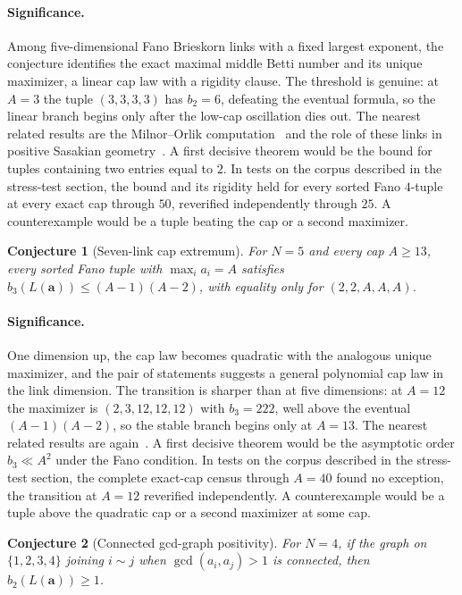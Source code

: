 \documentclass[11pt]{article}
\newtheorem{conjecture}{Conjecture}
\theoremstyle{definition}
\begin{document}
\paragraph{Significance.}
Among five-dimensional Fano Brieskorn links with a fixed largest exponent, the conjecture identifies the exact maximal middle Betti number and its unique maximizer, a linear cap law with a rigidity clause.  The threshold is genuine: at $A=3$ the tuple $(3,3,3,3)$ has $b_2=6$, defeating the eventual formula, so the linear branch begins only after the low-cap oscillation dies out.  The nearest related results are the Milnor--Orlik computation~\cite{MO70} and the role of these links in positive Sasakian geometry~\cite{BG08,BMvK16}.  A first decisive theorem would be the bound for tuples containing two entries equal to $2$.  In tests on the corpus described in the stress-test section, the bound and its rigidity held for every sorted Fano $4$-tuple at every exact cap through $50$, reverified independently through $25$.  A counterexample would be a tuple beating the cap or a second maximizer.

\begin{conjecture}[Seven-link cap extremum]\label{x7}
For $N=5$ and every cap $A\ge13$, every sorted Fano tuple with $\max_ia_i=A$ satisfies $b_3(L(\mathbf a))\le(A-1)(A-2)$, with equality only for $(2,2,A,A,A)$.
\end{conjecture}

\paragraph{Significance.}
One dimension up, the cap law becomes quadratic with the analogous unique maximizer, and the pair of statements suggests a general polynomial cap law in the link dimension.  The transition is sharper than at five dimensions: at $A=12$ the maximizer is $(2,3,12,12,12)$ with $b_3=222$, well above the eventual $(A-1)(A-2)$, so the stable branch begins only at $A=13$.  The nearest related results are again~\cite{MO70,BG08}.  A first decisive theorem would be the asymptotic order $b_3\ll A^2$ under the Fano condition.  In tests on the corpus described in the stress-test section, the complete exact-cap census through $A=40$ found no exception, the transition at $A=12$ reverified independently.  A counterexample would be a tuple above the quadratic cap or a second maximizer at some cap.

\begin{conjecture}[Connected gcd-graph positivity]\label{x8}
For $N=4$, if the graph on $\{1,2,3,4\}$ joining $i\sim j$ when $\gcd(a_i,a_j)>1$ is connected, then $b_2(L(\mathbf a))\ge1$.
\end{conjecture}
\end{document}
